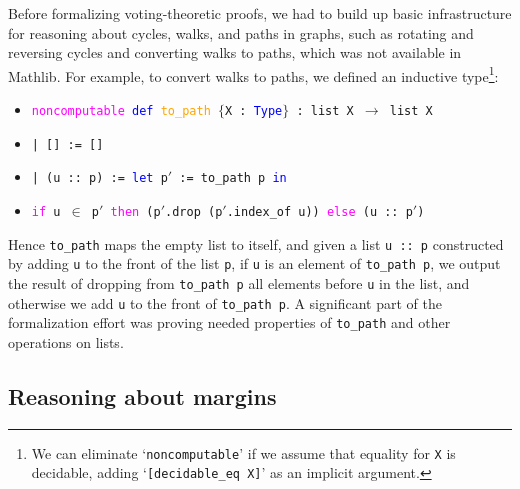 \documentclass[runningheads]{llncs}
\begin{document}
Before formalizing voting-theoretic proofs, we had to build up basic infrastructure for reasoning about cycles, walks, and paths in graphs, such as rotating and reversing cycles and converting walks to paths, which was not available in Mathlib. For example, to convert walks to paths, we defined an inductive type\footnote{We can eliminate `\texttt{noncomputable}' if we assume that equality for \texttt{X} is decidable, adding `\texttt{[decidable\_eq X]}' as an implicit argument. }:
\begin{itemize}
\item[] \texttt{\textcolor{magenta}{noncomputable} \textcolor{blue}{def} \textcolor{orange}{to\_path} $\{$X : \textcolor{blue}{Type}$\}$ : list X $\to$ list X}
\item[] \texttt{| [] := []}
\item[] \texttt{| (u :: p) := \textcolor{blue}{let} p$'$ := to\_path p \textcolor{blue}{in}}
\item[]    \quad\texttt{\textcolor{magenta}{if} u $\in$ p$'$ \textcolor{magenta}{then} (p$'$.drop (p$'$.index\_of u)) \textcolor{magenta}{else} (u :: p$'$)}
 \end{itemize}
Hence \texttt{to\_path} maps the empty list to itself, and given a list \texttt{u :: p} constructed by adding \texttt{u} to the front of the list \texttt{p},  if \texttt{u} is an element of \texttt{to\_path~p}, we output the result of dropping from \texttt{to\_path p} all elements before \texttt{u} in the list, and otherwise we add \texttt{u} to the front of \texttt{to\_path p}. A significant part of the formalization effort was proving needed properties of  \texttt{to\_path} and other operations on lists.

\subsection{Reasoning about margins}
\end{document}
